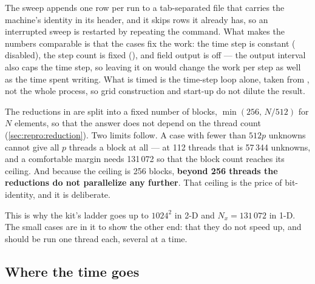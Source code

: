 The sweep appends one row per run to a tab-separated file that carries the
machine's identity in its header, and it skips rows it already has, so an
interrupted sweep is restarted by repeating the command. What makes the
numbers comparable is that the cases fix the work: the time step is constant
( disabled), the step count is fixed
(), and field output is off --- the output interval
also caps the time step, so leaving it on would change the work per step as
well as the time spent writing. What is timed is the time-step loop alone,
taken from , not the whole process, so grid construction and
start-up do not dilute the result.

\begin{warn}
  The reductions in  are split into a fixed number of blocks,
  $\min(256,\,N/512)$ for $N$ elements, so that the answer does not depend on
  the thread count (\cref{sec:repro:reduction}). Two limits follow. A case
  with fewer than $512p$ unknowns cannot give all $p$ threads a block at all
  --- at 112 threads that is 57\,344 unknowns, and a comfortable margin needs
  131\,072 so that the block count reaches its ceiling. And because the
  ceiling is 256 blocks, \textbf{beyond 256 threads the reductions do not
  parallelize any further}. That ceiling is the price of bit-identity, and it
  is deliberate.

  This is why the kit's ladder goes up to $1024^{2}$ in 2-D and $N_x =
  131\,072$ in 1-D. The small cases are in it to show the other end: that they
  do not speed up, and should be run one thread each, several at a time.
\end{warn}

\subsection{Where the time goes}
\label{sec:parallel:profile}

